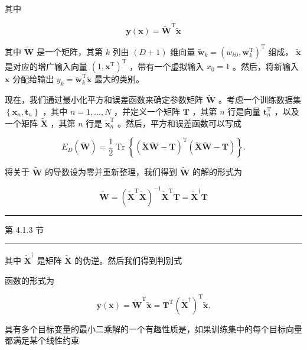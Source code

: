 \documentclass[10pt]{report}
\newcommand{\HRule}{\begin{center}\rule{0.9\linewidth}{0.2mm}\end{center}}
\begin{document}
其中

\[
\mathbf{y}\left( \mathbf{x}\right)  = {\widetilde{\mathbf{W}}}^{\mathrm{T}}\widetilde{\mathbf{x}} \tag{5.13}
\]

其中 \(\widetilde{\mathbf{W}}\) 是一个矩阵，其第 \(k\) 列由 \(\left( {D + 1}\right)\) 维向量 \({\widetilde{\mathbf{w}}}_{k} = {\left( {w}_{k0},{\mathbf{w}}_{k}^{\mathrm{T}}\right) }^{\mathrm{T}}\) 组成， \(\widetilde{\mathbf{x}}\) 是对应的增广输入向量 \({\left( 1,{\mathbf{x}}^{\mathrm{T}}\right) }^{\mathrm{T}}\) ，带有一个虚拟输入 \({x}_{0} = 1\) 。然后，将新输入 \(\mathbf{x}\) 分配给输出 \({y}_{k} = {\widetilde{\mathbf{w}}}_{k}^{\mathrm{T}}\widetilde{\mathbf{x}}\) 最大的类别。

现在，我们通过最小化平方和误差函数来确定参数矩阵 \(\widetilde{\mathbf{W}}\) 。考虑一个训练数据集 \(\left\{  {{\mathbf{x}}_{n},{\mathbf{t}}_{n}}\right\}\) ，其中 \(n = 1,\ldots ,N\) ，并定义一个矩阵 \(\mathbf{T}\) ，其第 \(n\) 行是向量 \({\mathbf{t}}_{n}^{\mathrm{T}}\) ，以及一个矩阵 \(\widetilde{\mathbf{X}}\) ，其第 \(n\) 行是 \({\widetilde{\mathbf{x}}}_{n}^{\mathrm{T}}\) 。然后，平方和误差函数可以写成

\[
{E}_{D}\left( \widetilde{\mathbf{W}}\right)  = \frac{1}{2}\operatorname{Tr}\left\{  {{\left( \widetilde{\mathbf{X}}\widetilde{\mathbf{W}} - \mathbf{T}\right) }^{\mathrm{T}}\left( {\widetilde{\mathbf{X}}\widetilde{\mathbf{W}} - \mathbf{T}}\right) }\right\}  . \tag{5.14}
\]

将关于 \(\widetilde{\mathbf{W}}\) 的导数设为零并重新整理，我们得到 \(\widetilde{\mathbf{W}}\) 的解的形式为

\[
\widetilde{\mathbf{W}} = {\left( {\widetilde{\mathbf{X}}}^{\mathrm{T}}\widetilde{\mathbf{X}}\right) }^{-1}{\widetilde{\mathbf{X}}}^{\mathrm{T}}\mathbf{T} = {\widetilde{\mathbf{X}}}^{ \dagger  }\mathbf{T} \tag{5.15}
\]

\HRule

第 4.1.3 节

\HRule

其中 \({\widetilde{\mathbf{X}}}^{ \dagger  }\) 是矩阵 \(\widetilde{\mathbf{X}}\) 的伪逆。然后我们得到判别式

函数的形式为

\[
\mathbf{y}\left( \mathbf{x}\right)  = {\widetilde{\mathbf{W}}}^{\mathrm{T}}\widetilde{\mathbf{x}} = {\mathbf{T}}^{\mathrm{T}}{\left( {\widetilde{\mathbf{X}}}^{ \dagger  }\right) }^{\mathrm{T}}\widetilde{\mathbf{x}}. \tag{5.16}
\]

具有多个目标变量的最小二乘解的一个有趣性质是，如果训练集中的每个目标向量都满足某个线性约束
\end{document}
